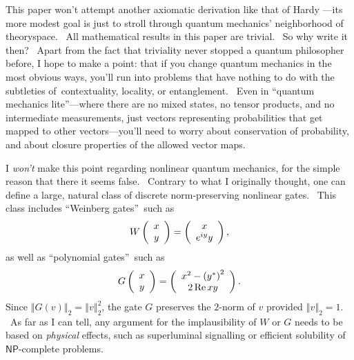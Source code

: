 \documentclass{article}%
\begin{document}
This paper won't attempt another axiomatic derivation like that of
Hardy \cite{hardy}---its more modest goal is just to stroll through quantum
mechanics' neighborhood of theoryspace. \ All mathematical results in this
paper are trivial. \ So why write it then? \ Apart from the fact that
triviality never stopped a quantum philosopher before, I hope to make a point:
that if you change quantum mechanics in the most obvious ways, you'll run into
problems that have nothing to do with the subtleties of\ contextuality,
locality, or entanglement. \ Even in \textquotedblleft quantum mechanics
lite\textquotedblright---where there are no mixed states, no tensor products,
and no intermediate measurements, just vectors representing probabilities that
get mapped to other vectors---you'll need to worry about conservation of
probability, and about closure properties of the allowed vector maps.

I \textit{won't} make this point regarding nonlinear quantum mechanics, for
the simple reason that there it seems false. \ Contrary to what I originally
thought, one can define a large, natural class of discrete norm-preserving
nonlinear gates. \ This class includes \textquotedblleft Weinberg
gates\textquotedblright\ such as%
\[
W\left(
\begin{array}
[c]{c}%
x\\
y
\end{array}
\right)  =\left(
\begin{array}
[c]{c}%
x\\
e^{iy}y
\end{array}
\right)  ,
\]
as well as \textquotedblleft polynomial gates\textquotedblright\ such as%
\[
G\left(
\begin{array}
[c]{c}%
x\\
y
\end{array}
\right)  =\left(
\begin{array}
[c]{c}%
x^{2}-\left(  y^{\ast}\right)  ^{2}\\
2\operatorname{Re}xy
\end{array}
\right)  .
\]
Since $\left\Vert G\left(  v\right)  \right\Vert _{2}=\left\Vert v\right\Vert
_{2}^{2}$, the gate $G$ preserves the $2$-norm of $v$ provided $\left\Vert
v\right\Vert _{2}=1$. \ As far as I can tell, any argument for the
implausibility of $W$ or $G$ needs to be based on \textit{physical} effects,
such as superluminal signalling or efficient solubility of $\mathsf{NP}%
$-complete problems.
\end{document}
